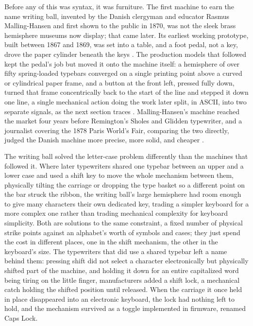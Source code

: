 \documentclass[11pt]{article}
\begin{document}
Before any of this was syntax, it was furniture. The first machine to earn the name writing ball, invented by the Danish clergyman and educator Rasmus Malling-Hansen and first shown to the public in 1870, was not the sleek brass hemisphere museums now display; that came later. Its earliest working prototype, built between 1867 and 1869, was set into a table, and a foot pedal, not a key, drove the paper cylinder beneath the keys \cite{mallinghansen2026}. The production models that followed kept the pedal's job but moved it onto the machine itself: a hemisphere of over fifty spring-loaded typebars converged on a single printing point above a curved or cylindrical paper frame, and a button at the front left, pressed fully down, turned that frame concentrically back to the start of the line and stepped it down one line, a single mechanical action doing the work later split, in ASCII, into two separate signals, as the next section traces \cite{mallinghansenball2026}. Malling-Hansen's machine reached the market four years before Remington's Sholes and Glidden typewriter, and a journalist covering the 1878 Paris World's Fair, comparing the two directly, judged the Danish machine more precise, more solid, and cheaper \cite{sciencemuseum2026}.

The writing ball solved the letter-case problem differently than the machines that followed it. Where later typewriters shared one typebar between an upper and a lower case and used a shift key to move the whole mechanism between them, physically tilting the carriage or dropping the type basket so a different point on the bar struck the ribbon, the writing ball's large hemisphere had room enough to give many characters their own dedicated key, trading a simpler keyboard for a more complex one rather than trading mechanical complexity for keyboard simplicity. Both are solutions to the same constraint, a fixed number of physical strike points against an alphabet's worth of symbols and cases; they just spend the cost in different places, one in the shift mechanism, the other in the keyboard's size. The typewriters that did use a shared typebar left a name behind them: pressing shift did not select a character electronically but physically shifted part of the machine, and holding it down for an entire capitalized word being tiring on the little finger, manufacturers added a shift lock, a mechanical catch holding the shifted position until released. When the carriage it once held in place disappeared into an electronic keyboard, the lock had nothing left to hold, and the mechanism survived as a toggle implemented in firmware, renamed Caps Lock.
\end{document}

